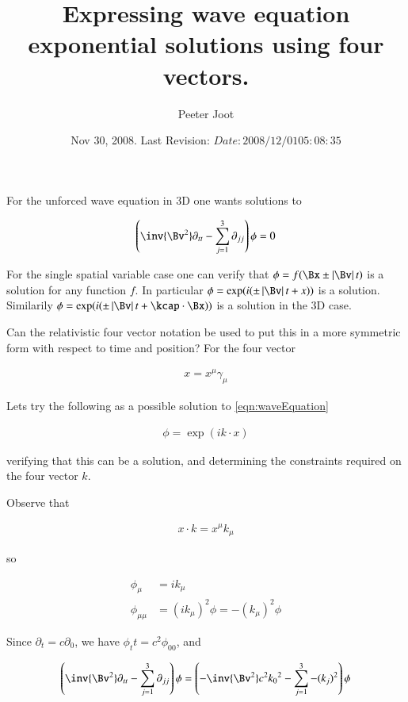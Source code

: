 \documentclass{article}
\title{ Expressing wave equation exponential solutions using four vectors. }
\author{Peeter Joot}
\date{ Nov 30, 2008.  Last Revision: $Date: 2008/12/01 05:08:35 $ }
\begin{document}
\maketitle{}


For the unforced wave equation in 3D one wants solutions to

\begin{align}\label{eqn:waveEquation}
\left( \inv{\Bv^2} \partial_{tt} - \sum_{j=1}^3 \partial_{jj}\right) \phi = 0
\end{align}

For the single spatial variable case one can verify that 
$\phi = f( \Bx \pm \Abs{\Bv} t)$ is a solution for any function $f$.  In particular $\phi = \exp(i (\pm \Abs{\Bv} t + x))$ is a solution.  Similarily
$\phi = \exp(i (\pm \Abs{\Bv} t + \kcap \cdot \Bx))$ is a solution in the 3D case.

Can the relativistic four vector notation be used to put this in a more symmetric form with respect to time and position?  For the four
vector

\begin{align*}
x = x^\mu \gamma_\mu
\end{align*}

Lets try the following as a possible solution to \ref{eqn:waveEquation}

\begin{align*}
\phi = \exp(i k \cdot x)
\end{align*}

verifying that this can be a solution, and determining the constraints required on the four vector $k$.

Observe that

\begin{align*}
x \cdot k = x^\mu k_\mu
\end{align*}

so

\begin{align*}
\phi_\mu &= i k_\mu \\
\phi_{\mu\mu} &= (i k_\mu)^2 \phi = -(k_\mu)^2 \phi
\end{align*}

Since $\partial_t = c\partial_0$, we have $\phi_tt = c^2 \phi_{00}$, and

\begin{align*}
\left( \inv{\Bv^2} \partial_{tt} - \sum_{j=1}^3 \partial_{jj}\right) \phi &= 
\left( -\inv{\Bv^2} c^2 {k_0}^2 - \sum_{j=1}^3 -(k_j)^2\right) \phi \\ 
\end{align*}
\end{document}
